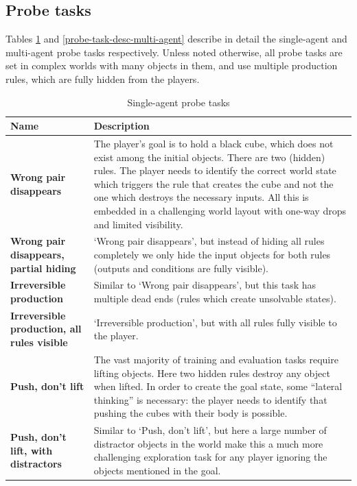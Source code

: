 \documentclass[11pt, a4paper, logo, copyright]{deepmind}
\begin{document}
\begin{appendix}
\subsection{Probe tasks}\label{appendix:probe_tasks}
Tables \ref{probe-task-desc-single-agent} and \ref{probe-task-desc-multi-agent} describe in detail the single-agent and multi-agent probe tasks respectively. Unless noted otherwise, all probe tasks are set in complex worlds with many objects in them, and use multiple production rules, which are fully hidden from the players.
\renewcommand*{\arraystretch}{1.4}
\begin{longtable}{|>{\raggedright}p{4cm}|p{12cm}|}
\caption{Single-agent probe tasks}
    \label{probe-task-desc-single-agent}
    \\ \hline
\textbf{Name} & \textbf{Description} \\ \hline
\textbf{Wrong pair disappears} & The player’s goal is to hold a black cube, which does not exist among the initial objects. There are two (hidden) rules. The player needs to identify the correct world state which triggers the rule that creates the cube and not the one which destroys the necessary inputs. All this is embedded in a challenging world layout with one-way drops and limited visibility. \\ \hline
\textbf{Wrong pair disappears, partial hiding} & `Wrong pair disappears', but instead of hiding all rules completely we only hide the input objects for both rules (outputs and conditions are fully visible). \\ \hline
\textbf{Irreversible production} & Similar to `Wrong pair disappears', but this task has multiple dead ends (rules which create unsolvable states). \\ \hline
\textbf{Irreversible production, all rules visible} & `Irreversible production', but with all rules fully visible to the player. \\ \hline
\textbf{Push, don't lift} & The vast majority of training and evaluation tasks require lifting objects. Here two hidden rules destroy any object when lifted. In order to create the goal state, some ``lateral thinking'' is necessary: the player needs to identify that pushing the cubes with their body is possible. \\ \hline
\textbf{Push, don't lift, with distractors} & Similar to `Push, don't lift', but here a large number of distractor objects in the world make this a much more challenging exploration task for any player ignoring the objects mentioned in the goal. \\ \hline

\end{longtable}
\end{appendix}
\end{document}
